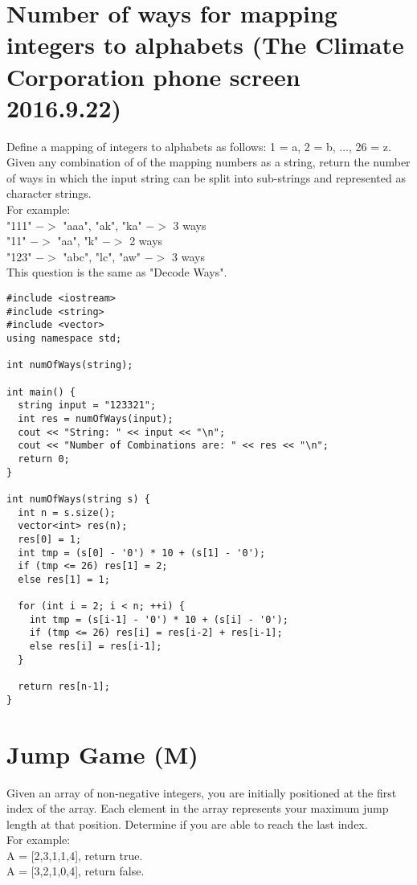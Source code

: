 \section{Number of ways for mapping integers to alphabets (The Climate Corporation phone screen 2016.9.22)}
Define a mapping of integers to alphabets as follows: 1 = a, 2 = b, ..., 26 = z. Given any combination of of the mapping numbers as a string, return the number of ways in which the input string can be split into sub-strings and represented as character strings. \\

For example:\\
"111" $->$ "aaa", "ak", "ka" $->$ 3 ways\\
"11" $->$ "aa", "k" $->$ 2 ways\\
"123" $->$ "abc", "lc", "aw" $->$ 3 ways\\

This question is the same as "Decode Ways".\\

\begin{lstlisting}
#include <iostream>
#include <string>
#include <vector>
using namespace std;

int numOfWays(string);

int main() {
  string input = "123321";
  int res = numOfWays(input);
  cout << "String: " << input << "\n";
  cout << "Number of Combinations are: " << res << "\n";
  return 0;
}

int numOfWays(string s) {
  int n = s.size();
  vector<int> res(n);
  res[0] = 1;
  int tmp = (s[0] - '0') * 10 + (s[1] - '0');
  if (tmp <= 26) res[1] = 2;
  else res[1] = 1;
  
  for (int i = 2; i < n; ++i) {
    int tmp = (s[i-1] - '0') * 10 + (s[i] - '0');    
    if (tmp <= 26) res[i] = res[i-2] + res[i-1];
    else res[i] = res[i-1];
  }
    
  return res[n-1];
}
\end{lstlisting}


\section{Jump Game (M)}
Given an array of non-negative integers, you are initially positioned at the first index of the array. Each element in the array represents your maximum jump length at that position. Determine if you are able to reach the last index.\\

For example:\\
A = [2,3,1,1,4], return true.\\
A = [3,2,1,0,4], return false. \\

